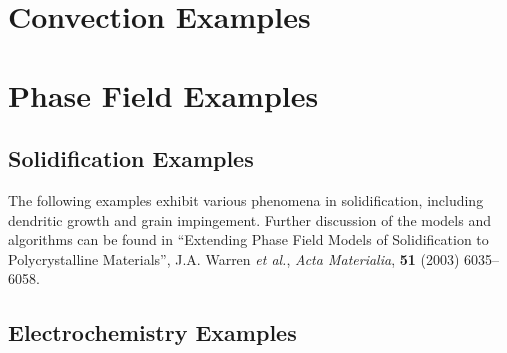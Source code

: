 \documentclass[tocAsPDFpart]{fipy}
\begin{document}
\chapter{Convection Examples}


\newpage

\newpage

\newpage

\newpage

\newpage

\chapter{Phase Field Examples}

\section*{Solidification Examples}

The following examples exhibit various phenomena in solidification, including
dendritic growth and grain impingement.  Further discussion of the
models and algorithms can be found in ``Extending Phase Field Models
of Solidification to Polycrystalline Materials'', J.A. Warren \emph{et
al.}, \textit{Acta Materialia}, \textbf{51} (2003) 6035--6058.


\newpage

\newpage

\newpage

\newpage

\newpage

\newpage

\newpage

\newpage

\section*{Electrochemistry Examples}
\end{document}
